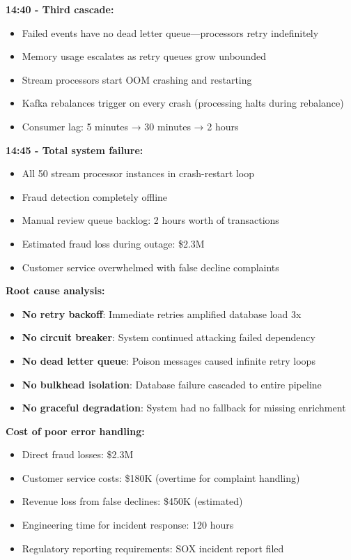 \textbf{14:40 - Third cascade:}
\begin{itemize}
    \item Failed events have no dead letter queue---processors retry indefinitely
    \item Memory usage escalates as retry queues grow unbounded
    \item Stream processors start OOM crashing and restarting
    \item Kafka rebalances trigger on every crash (processing halts during rebalance)
    \item Consumer lag: 5 minutes → 30 minutes → 2 hours
\end{itemize}

\textbf{14:45 - Total system failure:}
\begin{itemize}
    \item All 50 stream processor instances in crash-restart loop
    \item Fraud detection completely offline
    \item Manual review queue backlog: 2 hours worth of transactions
    \item Estimated fraud loss during outage: \$2.3M
    \item Customer service overwhelmed with false decline complaints
\end{itemize}

\textbf{Root cause analysis:}
\begin{itemize}
    \item \textbf{No retry backoff}: Immediate retries amplified database load 3x
    \item \textbf{No circuit breaker}: System continued attacking failed dependency
    \item \textbf{No dead letter queue}: Poison messages caused infinite retry loops
    \item \textbf{No bulkhead isolation}: Database failure cascaded to entire pipeline
    \item \textbf{No graceful degradation}: System had no fallback for missing enrichment
\end{itemize}

\textbf{Cost of poor error handling:}
\begin{itemize}
    \item Direct fraud losses: \$2.3M
    \item Customer service costs: \$180K (overtime for complaint handling)
    \item Revenue loss from false declines: \$450K (estimated)
    \item Engineering time for incident response: 120 hours
    \item Regulatory reporting requirements: SOX incident report filed
\end{itemize}

